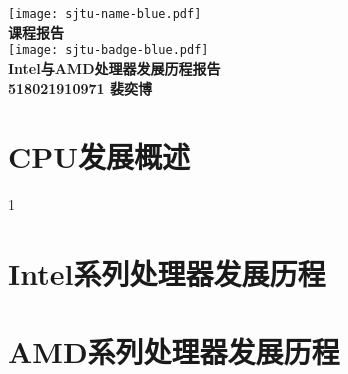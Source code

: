 \documentclass[UTF8]{ctexart}
\begin{document}
\begin{titlepage}
    \begin{center}
        \texttt{[image: sjtu-name-blue.pdf]}\\[1cm]
        \textsc{\Huge \bfseries 课程报告}\\[1.5cm]
        \texttt{[image: sjtu-badge-blue.pdf]}\\[0.5cm]    

        \Huge \bfseries{Intel与AMD处理器发展历程报告}\\[1cm]
        \Large \bfseries{518021910971 裴奕博}
    \end{center}
\end{titlepage}
\section{CPU发展概述}
1
\section{Intel系列处理器发展历程}

\section{AMD系列处理器发展历程}
\end{document}
